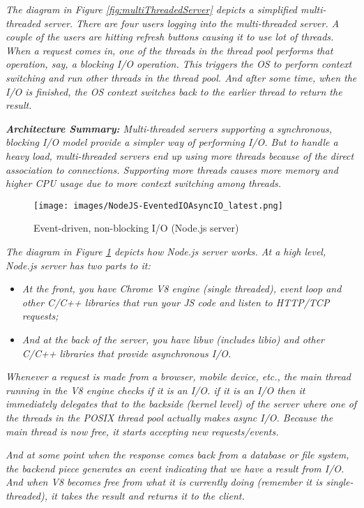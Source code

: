 \textit{The diagram in Figure \ref{fig:multiThreadedServer} depicts a simplified multi-threaded server. There are four users logging into the multi-threaded server. A couple of the users are hitting refresh buttons causing it to use lot of threads. When a request comes in, one of the threads in the thread pool performs that operation, say, a blocking I/O operation. This triggers the OS to perform context switching and run other threads in the thread pool. And after some time, when the I/O is finished, the OS context switches back to the earlier thread to return the result.}

\textit{\textbf{Architecture Summary:} Multi-threaded servers supporting a synchronous, blocking I/O model provide a simpler way of performing I/O. But to handle a heavy load, multi-threaded servers end up using more threads because of the direct association to connections. Supporting more threads causes more memory and higher CPU usage due to more context switching among threads.}

\begin{figure}[H]
\centering %
\texttt{[image: images/NodeJS-EventedIOAsyncIO\_latest.png]}
\caption{Event-driven, non-blocking I/O (Node.js server)}
\label{fig:nodejsServer}
\end{figure}

\textit{The diagram in Figure \ref{fig:nodejsServer} depicts how Node.js server works. At a high level, Node.js server has two parts to it:}
\begin{itemize}
\item \textit{At the front, you have Chrome V8 engine (single threaded), event loop and other C/C++ libraries that run your JS code and listen to HTTP/TCP requests;}
\item \textit{And at the back of the server, you have libuv (includes libio) and other C/C++ libraries that provide asynchronous I/O.}
\end{itemize}

\textit{Whenever a request is made from a browser, mobile device, etc., the main thread running in the V8 engine checks if it is an I/O. if it is an I/O then it immediately delegates that to the backside (kernel level) of the server where one of the threads in the POSIX thread pool actually makes async I/O. Because the main thread is now free, it starts accepting new requests/events.}

\textit{And at some point when the response comes back from a database or file system, the backend piece generates an event indicating that we have a result from I/O. And when V8 becomes free from what it is currently doing (remember it is single-threaded), it takes the result and returns it to the client.}

